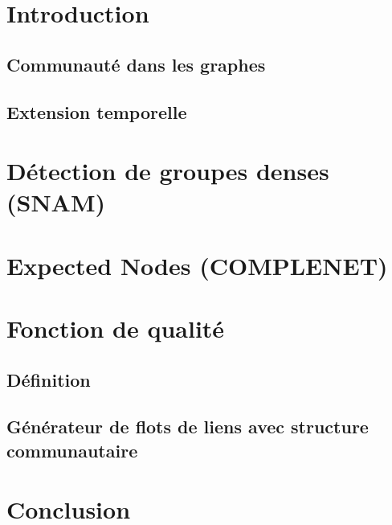 \chapter{Introduction}
\section{Communauté dans les graphes}
\cite{Fortunato2010}
\section{Extension temporelle}






\chapter{Détection de groupes denses (SNAM)}

\chapter{Expected Nodes (COMPLENET)}

\chapter{Fonction de qualité}
\section{Définition}
\section{Générateur de flots de liens avec structure communautaire}

\chapter{Conclusion}

